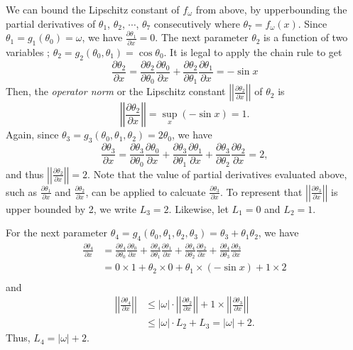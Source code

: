 \documentclass[12pt]{report}
\numberwithin{figure}{chapter}
\theoremstyle{plain}
\theoremstyle{definition}
\theoremstyle{corollary}
\theoremstyle{definition}
\theoremstyle{plain}
\theoremstyle{definition}
\theoremstyle{plain}
\newcommand\pa[2]{\ensuremath{\frac{\partial #1}{\partial #2}}}
\newcommand\norm[1]{\ensuremath{\left|\left|#1\right|\right|}}
\begin{document}
We can bound the Lipschitz constant of \(f_\omega\) from above, by upperbounding the partial derivatives of \(\theta_1\), \(\theta_2\), \(\cdots\), \(\theta_7\) consecutively where \(\theta_7=f_\omega(x)\).
Since \(\theta_1=g_1(\theta_0)=\omega\), we have \(\frac{\partial\theta_1}{\partial x}=0\).
The next parameter \(\theta_2\) is a function of two variables ; \(\theta_2=g_2(\theta_0,\theta_1)=\cos\theta_0\).
It is legal to apply the chain rule to get
\[\pa{\theta_2}x=\pa{\theta_2}{\theta_0}\pa{\theta_0}x+\pa{\theta_2}{\theta_1}\pa{\theta_1}x=-\sin x\]
Then, the \emph{operator norm} or the Lipschitz constant \norm{\pa{\theta_2}x} of \(\theta_2\) is
\[\norm{\pa{\theta_2}x}=\sup_x(-\sin x)=1.\]
Again, since \(\theta_3=g_3(\theta_0,\theta_1,\theta_2)=2\theta_0\), we have
\[\pa{\theta_3}x=\pa{\theta_3}{\theta_0}\pa{\theta_0}x+\pa{\theta_3}{\theta_1}\pa{\theta_1}x+\pa{\theta_3}{\theta_2}\pa{\theta_2}x=2,\]
and thus \(\norm{\pa{\theta_2}x}=2\).
Note that the value of partial derivatives evaluated above, such as \pa{\theta_1}x and \pa{\theta_2}x, can be applied to calcuate \pa{\theta_3}x.
To represent that \norm{\pa{\theta_3}x} is upper bounded by 2, we write \(L_3=2\).
Likewise, let \(L_1=0\) and \(L_2=1\).

For the next parameter \(\theta_4=g_4(\theta_0,\theta_1,\theta_2,\theta_3)=\theta_3+\theta_1\theta_2\), we have
\begin{align*}
\pa{\theta_4}x
&=\pa{\theta_4}{\theta_0}\pa{\theta_0}x+\pa{\theta_4}{\theta_1}\pa{\theta_1}x+\pa{\theta_4}{\theta_2}\pa{\theta_2}x
+\pa{\theta_4}{\theta_3}\pa{\theta_3}x\\
&=0\times1+\theta_2\times0+\theta_1\times(-\sin x)+1\times2\\
\end{align*}
and
\begin{align*}
\norm{\pa{\theta_4}x}
&\le|\omega|\cdot\norm{\pa{\theta_2}x}+1\times\norm{\pa{\theta_3}x}\\
&\le|\omega|\cdot L_2+L_3=|\omega|+2.
\end{align*}
Thus, \(L_4=|\omega|+2\).
\end{document}
